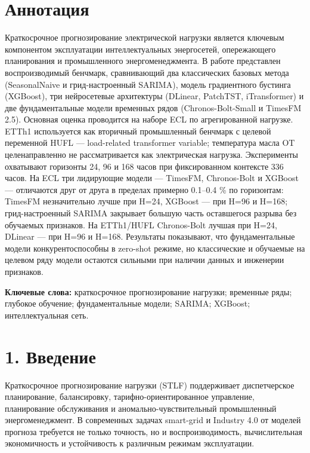 \section{Аннотация}\label{ux430ux43dux43dux43eux442ux430ux446ux438ux44f}

Краткосрочное прогнозирование электрической нагрузки является ключевым
компонентом эксплуатации интеллектуальных энергосетей, опережающего
планирования и промышленного энергоменеджмента. В работе представлен
воспроизводимый бенчмарк, сравнивающий два классических базовых метода
(SeasonalNaive и грид-настроенный SARIMA), модель градиентного бустинга
(XGBoost), три нейросетевые архитектуры (DLinear, PatchTST,
iTransformer) и две фундаментальные модели временных рядов
(Chronos-Bolt-Small и TimesFM 2.5). Основная оценка проводится на наборе
ECL по агрегированной нагрузке. ETTh1 используется как вторичный
промышленный бенчмарк с целевой переменной HUFL --- load-related
transformer variable; температура масла OT целенаправленно не
рассматривается как электрическая нагрузка. Эксперименты охватывают
горизонты 24, 96 и 168 часов при фиксированном контексте 336 часов. На
ECL три лидирующие модели --- TimesFM, Chronos-Bolt и XGBoost ---
отличаются друг от друга в пределах примерно 0.1--0.4 \% по горизонтам:
TimesFM незначительно лучше при H=24, XGBoost --- при H=96 и H=168;
грид-настроенный SARIMA закрывает большую часть оставшегося разрыва без
обучаемых признаков. На ETTh1/HUFL Chronos-Bolt лучшая при H=24, DLinear
--- при H=96 и H=168. Результаты показывают, что фундаментальные модели
конкурентоспособны в zero-shot режиме, но классические и обучаемые на
целевом ряду модели остаются сильными при наличии данных и инженерии
признаков.

\textbf{Ключевые слова:} краткосрочное прогнозирование нагрузки;
временные ряды; глубокое обучение; фундаментальные модели; SARIMA;
XGBoost; интеллектуальная сеть.

\section{1. Введение}\label{ux432ux432ux435ux434ux435ux43dux438ux435}

Краткосрочное прогнозирование нагрузки (STLF) поддерживает диспетчерское
планирование, балансировку, тарифно-ориентированное управление,
планирование обслуживания и аномально-чувствительный промышленный
энергоменеджмент. В современных задачах smart-grid и Industry 4.0 от
моделей прогноза требуется не только точность, но и воспроизводимость,
вычислительная экономичность и устойчивость к различным режимам
эксплуатации.

